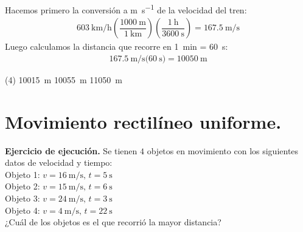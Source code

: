\documentclass[12pt, letter]{exam}
\begin{document}
\begin{questions}
    \vspace*{0.5cm}
    Hacemos primero la conversión a \unit{\meter\per\second} de la velocidad del tren:
    \begin{align*}
        \SI[per-mode=fraction]{603}{\kilo\meter\per\hour} \left( \dfrac{\SI{1000}{\meter}}{\SI{1}{\kilo\meter}} \right) \left( \dfrac{\SI{1}{\hour}}{\SI{3600}{\second}} \right) = \SI[per-mode=fraction]{167.5}{\meter\per\second}
    \end{align*}
    Luego calculamos la distancia que recorre en \SI{1}{\minute} = \SI{60}{\second}:
    \begin{align*}
        \SI[per-mode=fraction]{167.5}{\meter\per\second} \bigg( \SI{60}{\second} \bigg) = \SI{10050}{\meter}
    \end{align*}
    \begin{tasks}(4)
        \task \SI{10015}{\meter}
        \task {}
        \task \SI{10055}{\meter}
        \task \SI{11050}{\meter}
    \end{tasks}

    \section{Movimiento rectilíneo uniforme.}

    \setcounter{question}{4} \question  \label{Ejercicio_02} \textbf{Ejercicio de ejecución. } Se tienen $4$ objetos en movimiento con los siguientes datos de velocidad y tiempo: \\[0.3em]
    Objeto 1: $v = \SI{16}{\meter\per\second}, \, t = \SI{5}{\second}$ \\[0.3em]
    Objeto 2: $v = \SI{15}{\meter\per\second}, \, t = \SI{6}{\second}$ \\[0.3em]
    Objeto 3: $v = \SI{24}{\meter\per\second}, \, t = \SI{3}{\second}$ \\[0.3em]
    Objeto 4: $v = \SI{4}{\meter\per\second}, \, t = \SI{22}{\second}$ \\[0.3em]
    ¿Cuál de los objetos es el que recorrió la mayor distancia? 
    

\end{questions}
\end{document}
